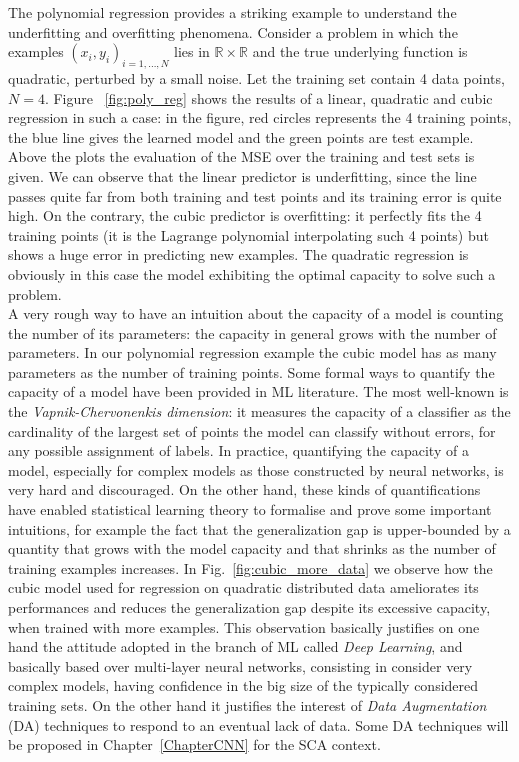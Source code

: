 The polynomial regression provides a striking example to understand the underfitting and overfitting phenomena. Consider a problem in which the examples $(x_i,y_i)_{i=1,\dots,N}$ lies in $\mathbb{R} \times \mathbb{R}$ and the true underlying function is quadratic, perturbed by a small noise. Let the training set contain 4 data points, \ie $N=4$. Figure ~\ref{fig:poly_reg} shows the results of a linear, quadratic and cubic regression in such a case: in the figure, red circles represents the 4 training points, the blue line gives the learned model and the green points are test example. Above the plots the evaluation of the MSE over the training and test sets is given. We can observe that the linear predictor is underfitting, since the line passes quite far from both training and test points and its training error is quite high. On the contrary, the cubic predictor is overfitting: it perfectly fits the 4 training points (it is the Lagrange polynomial interpolating such 4 points) but shows a huge error in predicting new examples. The quadratic regression is obviously in this case the model exhibiting the optimal capacity to solve such a problem. \\

A very rough way to have an intuition about the capacity of a model is counting the number of its parameters: the capacity in general grows with the number of parameters. In our polynomial regression example the cubic model has as many parameters as the number of training points. Some formal ways to quantify the capacity of a model have been provided in ML literature. The most well-known is the \emph{Vapnik-Chervonenkis dimension}: it measures the capacity of a classifier as the cardinality of the largest set of points the model can classify without errors, for any possible assignment of labels. In practice, quantifying the capacity of a model, especially for complex models as those constructed by neural networks, is very hard and discouraged. On the other hand, these kinds of quantifications have enabled statistical learning theory to formalise and prove some important intuitions, for example the fact that the generalization gap is upper-bounded by a quantity that grows with the model capacity and that shrinks as the number of training examples increases. In Fig.~\ref{fig:cubic_more_data} we observe how the cubic model used for regression on quadratic distributed data ameliorates its performances and reduces the generalization gap despite its excessive capacity, when trained with more examples. This observation basically justifies on one hand the attitude adopted in the branch of ML called \emph{Deep Learning}, and basically based over multi-layer neural networks, consisting in consider very complex models, having confidence in the big size of the typically considered training sets. On the other hand it justifies the interest of \emph{Data Augmentation} (DA) techniques to respond to an eventual lack of data. Some DA techniques will be proposed in Chapter~\ref{ChapterCNN} for the SCA context.

